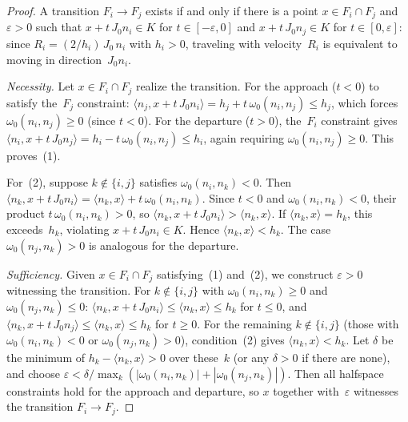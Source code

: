 \begin{proof}
A transition $F_i \to F_j$ exists if and only if
there is a point $x \in F_i \cap F_j$ and
$\varepsilon > 0$ such that
$x + t\, J_0 n_i \in K$ for $t \in [-\varepsilon, 0]$
and $x + t\, J_0 n_j \in K$ for $t \in [0, \varepsilon]$:
since $R_i = (2/h_i)\, J_0\, n_i$ with $h_i > 0$,
traveling with velocity~$R_i$ is equivalent to
moving in direction~$J_0 n_i$.

\emph{Necessity.}
Let $x \in F_i \cap F_j$ realize the transition.
For the approach ($t < 0$) to satisfy
the~$F_j$ constraint:
$\langle n_j, x + t\, J_0 n_i \rangle
= h_j + t\,\omega_0(n_i, n_j) \leq h_j$,
which forces $\omega_0(n_i, n_j) \geq 0$
(since $t < 0$).
For the departure ($t > 0$), the~$F_i$ constraint gives
$\langle n_i, x + t\, J_0 n_j \rangle
= h_i - t\,\omega_0(n_i, n_j) \leq h_i$,
again requiring $\omega_0(n_i, n_j) \geq 0$.
This proves~(1).

For~(2), suppose $k \notin \{i,j\}$ satisfies
$\omega_0(n_i, n_k) < 0$.
Then
$\langle n_k, x + t\, J_0 n_i \rangle
= \langle n_k, x \rangle + t\,\omega_0(n_i, n_k)$.
Since $t < 0$ and $\omega_0(n_i, n_k) < 0$,
their product $t\,\omega_0(n_i, n_k) > 0$, so
$\langle n_k, x + t\, J_0 n_i \rangle
> \langle n_k, x \rangle$.
If $\langle n_k, x \rangle = h_k$, this
exceeds~$h_k$, violating $x + t\, J_0 n_i \in K$.
Hence $\langle n_k, x \rangle < h_k$.
The case $\omega_0(n_j, n_k) > 0$ is analogous
for the departure.

\emph{Sufficiency.}
Given $x \in F_i \cap F_j$ satisfying~(1) and~(2),
we construct $\varepsilon > 0$ witnessing
the transition.
For $k \notin \{i,j\}$ with
$\omega_0(n_i, n_k) \geq 0$ and
$\omega_0(n_j, n_k) \leq 0$:
$\langle n_k, x + t\, J_0 n_i \rangle
\leq \langle n_k, x \rangle \leq h_k$
for $t \leq 0$,
and
$\langle n_k, x + t\, J_0 n_j \rangle
\leq \langle n_k, x \rangle \leq h_k$
for $t \geq 0$.
For the remaining $k \notin \{i,j\}$
(those with $\omega_0(n_i, n_k) < 0$ or
$\omega_0(n_j, n_k) > 0$),
condition~(2) gives
$\langle n_k, x \rangle < h_k$.
Let $\delta$ be the minimum of
$h_k - \langle n_k, x \rangle > 0$
over these~$k$ (or any $\delta > 0$ if there are none),
and choose
$\varepsilon < \delta / \max_k(
|\omega_0(n_i, n_k)| + |\omega_0(n_j, n_k)|)$.
Then all halfspace constraints hold for the
approach and departure, so $x$ together
with~$\varepsilon$ witnesses the transition
$F_i \to F_j$.
\end{proof}

